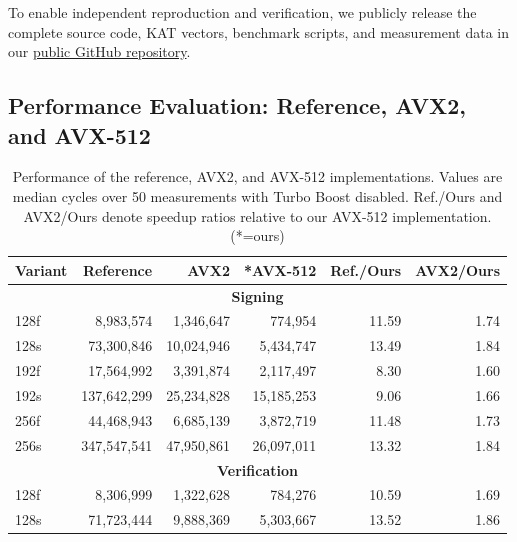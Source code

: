 To enable independent reproduction and verification, we publicly
release the complete source code, KAT vectors, benchmark scripts,
and measurement data in our
\href{https://github.com/Lee-Seungwon1215/AIMer_on_AVX512}
{public GitHub repository}.

\subsection{Performance Evaluation: Reference, AVX2, and AVX-512}

\begin{table}[h]
\centering
\caption{Performance of the reference, AVX2, and AVX-512 implementations.
Values are median cycles over 50 measurements with Turbo Boost disabled.
Ref./Ours and AVX2/Ours denote speedup ratios relative to our AVX-512
implementation. (*=ours)}
\label{tab:e2e}

{\footnotesize
\renewcommand{\arraystretch}{0.95}

\begin{tabular*}{\linewidth}{
  @{\extracolsep{\fill}}lrrrrr@{}
}
\toprule
Variant
& Reference
& AVX2
& \textbf{*AVX-512}
& Ref./Ours
& AVX2/Ours \\
\midrule

\multicolumn{6}{c}{\textbf{Signing}} \\
128f
& 8{,}983{,}574
& 1{,}346{,}647
& 774{,}954
& 11.59
& 1.74 \\

128s
& 73{,}300{,}846
& 10{,}024{,}946
& 5{,}434{,}747
& 13.49
& 1.84 \\

192f
& 17{,}564{,}992
& 3{,}391{,}874
& 2{,}117{,}497
& 8.30
& 1.60 \\

192s
& 137{,}642{,}299
& 25{,}234{,}828
& 15{,}185{,}253
& 9.06
& 1.66 \\

256f
& 44{,}468{,}943
& 6{,}685{,}139
& 3{,}872{,}719
& 11.48
& 1.73 \\

256s
& 347{,}547{,}541
& 47{,}950{,}861
& 26{,}097{,}011
& 13.32
& 1.84 \\

\midrule
\multicolumn{6}{c}{\textbf{Verification}} \\

128f
& 8{,}306{,}999
& 1{,}322{,}628
& 784{,}276
& 10.59
& 1.69 \\

128s
& 71{,}723{,}444
& 9{,}888{,}369
& 5{,}303{,}667
& 13.52
& 1.86 \\


\end{tabular*}}
\end{table}
